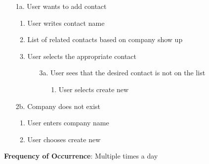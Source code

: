 \begin{itemize}
  \item [1a.] User wants to add contact
  \begin{enumerate}
    \item User writes contact name
    \item List of related contacts based on company show up
    \item User selects the appropriate contact
    \begin{itemize}
      \item [3a.] User sees that the desired contact is not on the list
      \begin{enumerate}
        \item [1.] User selects create new
      \end{enumerate}
    \end{itemize}
  \end{enumerate}
  \item [2b.] Company does not exist
  \begin{enumerate}
    \item User enters company name
    \item User chooses create new
  \end{enumerate}
\end{itemize}
\textbf{Frequency of Occurrence}: Multiple times a day


